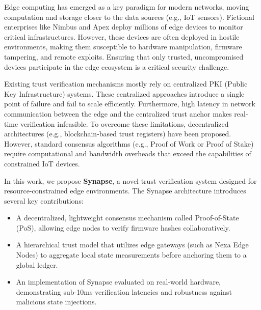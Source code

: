 Edge computing has emerged as a key paradigm for modern networks, moving computation and storage closer to the data sources (e.g., IoT sensors). Fictional enterprises like Nimbus and Apex deploy millions of edge devices to monitor critical infrastructures. However, these devices are often deployed in hostile environments, making them susceptible to hardware manipulation, firmware tampering, and remote exploits. Ensuring that only trusted, uncompromised devices participate in the edge ecosystem is a critical security challenge.

Existing trust verification mechanisms mostly rely on centralized PKI (Public Key Infrastructure) systems. These centralized approaches introduce a single point of failure and fail to scale efficiently. Furthermore, high latency in network communication between the edge and the centralized trust anchor makes real-time verification infeasible. To overcome these limitations, decentralized architectures (e.g., blockchain-based trust registers) have been proposed. However, standard consensus algorithms (e.g., Proof of Work or Proof of Stake) require computational and bandwidth overheads that exceed the capabilities of constrained IoT devices.

In this work, we propose \textbf{Synapse}, a novel trust verification system designed for resource-constrained edge environments. The Synapse architecture introduces several key contributions:
\begin{itemize}
    \item A decentralized, lightweight consensus mechanism called Proof-of-State (PoS), allowing edge nodes to verify firmware hashes collaboratively.
    \item A hierarchical trust model that utilizes edge gateways (such as Nexa Edge Nodes) to aggregate local state measurements before anchoring them to a global ledger.
    \item An implementation of Synapse evaluated on real-world hardware, demonstrating sub-10ms verification latencies and robustness against malicious state injections.
\end{itemize}
